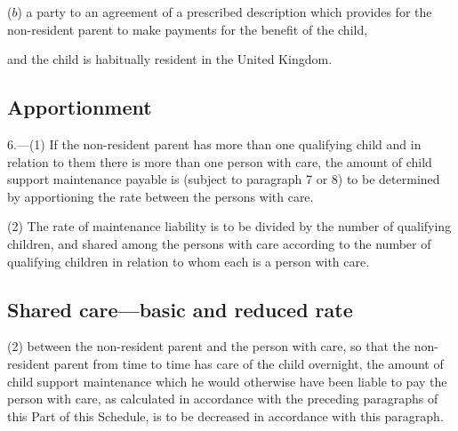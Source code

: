 \documentclass[12pt,a4paper]{article}
\begin{document}
{{\begin{enumerate}
($b$) a party to an agreement of a prescribed description which provides for the non-resident parent to make payments for the benefit of the child,
\end{enumerate}
and the child is habitually resident in the United Kingdom.


}

\subsection*{Apportionment}

6.---(1) If the non-resident parent has more than one qualifying child and in relation to them there is more than one person with care, the amount of child support maintenance payable is (subject to paragraph 7 or 8) to be determined by apportioning the rate between the persons with care.

(2) The rate of maintenance liability is to be divided by the number of qualifying children, and shared among the persons with care according to the number of qualifying children in relation to whom each is a person with care.

\subsection*{Shared care---basic and reduced rate}



(2)  between the non-resident parent and the person with care, so that the non-resident parent from time to time has care of the child overnight, the amount of child support maintenance which he would otherwise have been liable to pay the person with care, as calculated in accordance with the preceding paragraphs of this Part of this Schedule, is to be decreased in accordance with this paragraph.

}
\end{document}
